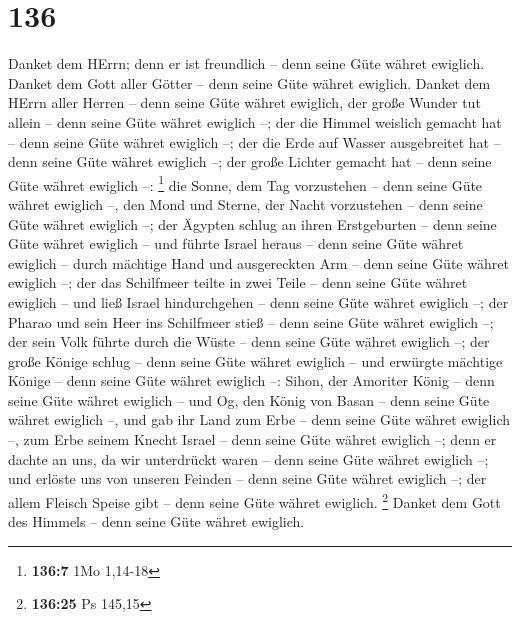 \hypertarget{section-135}{%
\section{136}\label{section-135}}

 Danket dem HErrn; denn er ist freundlich -- denn seine
Güte währet ewiglich.  Danket dem Gott aller Götter --
denn seine Güte währet ewiglich.  Danket dem HErrn aller
Herren -- denn seine Güte währet ewiglich,  der große
Wunder tut allein -- denn seine Güte währet ewiglich --; 
der die Himmel weislich gemacht hat -- denn seine Güte währet ewiglich
--;  der die Erde auf Wasser ausgebreitet hat -- denn
seine Güte währet ewiglich --;  der große Lichter gemacht
hat -- denn seine Güte währet ewiglich --: \footnote{\textbf{136:7} 1Mo
  1,14-18}  die Sonne, dem Tag vorzustehen -- denn seine
Güte währet ewiglich --,  den Mond und Sterne, der Nacht
vorzustehen -- denn seine Güte währet ewiglich --;  der
Ägypten schlug an ihren Erstgeburten -- denn seine Güte währet ewiglich
--  und führte Israel heraus -- denn seine Güte währet
ewiglich --  durch mächtige Hand und ausgereckten Arm --
denn seine Güte währet ewiglich --;  der das Schilfmeer
teilte in zwei Teile -- denn seine Güte währet ewiglich --
 und ließ Israel hindurchgehen -- denn seine Güte währet
ewiglich --;  der Pharao und sein Heer ins Schilfmeer
stieß -- denn seine Güte währet ewiglich --;  der sein
Volk führte durch die Wüste -- denn seine Güte währet ewiglich --;
 der große Könige schlug -- denn seine Güte währet
ewiglich --  und erwürgte mächtige Könige -- denn seine
Güte währet ewiglich --:  Sihon, der Amoriter König --
denn seine Güte währet ewiglich --  und Og, den König von
Basan -- denn seine Güte währet ewiglich --,  und gab ihr
Land zum Erbe -- denn seine Güte währet ewiglich --,  zum
Erbe seinem Knecht Israel -- denn seine Güte währet ewiglich --;
 denn er dachte an uns, da wir unterdrückt waren -- denn
seine Güte währet ewiglich --;  und erlöste uns von
unseren Feinden -- denn seine Güte währet ewiglich --; 
der allem Fleisch Speise gibt -- denn seine Güte währet ewiglich.
\footnote{\textbf{136:25} Ps 145,15}  Danket dem Gott des
Himmels -- denn seine Güte währet ewiglich.


